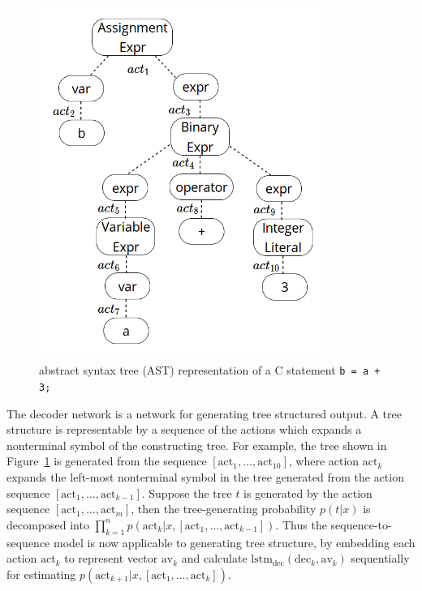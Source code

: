 \documentclass[senior,final,11pt]{iscs-thesis}
\begin{document}
\begin{figure}[]
	\begin{center}
	\includegraphics[height=11.5cm]{ast_zu.png}
	\end{center}
	\caption{abstract syntax tree (AST) representation of a C statement \texttt{b = a + 3;} }
	\label{fig:ast_zu}
\end{figure}

The decoder network is a network for generating tree structured output. 
A tree structure is representable by a sequence of the actions which expands a nonterminal symbol of the constructing tree.
For example, the tree shown in Figure~\ref{fig:ast_zu} is generated from the sequence $ [\mathrm{act}_1, \dots, \mathrm{act}_{10}] $, 
where action $ \mathrm{act}_k $ expands the left-most nonterminal symbol in the tree generated from the action sequence $ [\mathrm{act}_1, \dots, \mathrm{act}_{k-1}] $. 
Suppose the tree $t$ is generated by the action sequence $ [\mathrm{act}_1, \dots, \mathrm{act}_m] $, 
then the tree-generating probability $ p(t|x) $ is decomposed into $ \prod_{k=1}^n p(\mathrm{act}_k|x,[\mathrm{act}_1, \dots, \mathrm{act}_{k-1}]) $. 
Thus the sequence-to-sequence model is now applicable to generating tree structure, by embedding each action $\mathrm{act}_k$ to represent vector $\mathrm{av}_k$ and 
calculate $ \mathrm{lstm}_{\mathrm{dec}}(\mathrm{dec}_{k},\mathrm{av}_{k}) $ sequentially for estimating $p(\mathrm{act}_{k+1}|x,[\mathrm{act}_1, \dots, \mathrm{act}_{k}]) $.  
\end{document}
